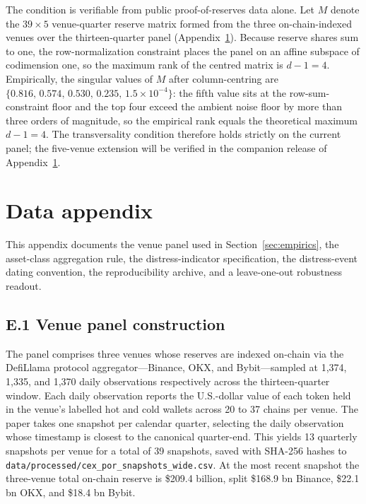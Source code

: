The condition is verifiable from public proof-of-reserves data
alone. Let $M$ denote the $39 \times 5$ venue-quarter reserve
matrix formed from the three on-chain-indexed venues over the
thirteen-quarter panel (Appendix~\ref{app:data}). Because reserve
shares sum to one, the row-normalization constraint places the
panel on an affine subspace of codimension one, so the maximum
rank of the centred matrix is $d - 1 = 4$. Empirically, the
singular values of $M$ after column-centring are
$\{0.816,\,0.574,\,0.530,\,0.235,\,1.5\times 10^{-4}\}$: the fifth
value sits at the row-sum-constraint floor and the top four
exceed the ambient noise floor by more than three orders of
magnitude, so the empirical rank equals the theoretical maximum
$d - 1 = 4$. The transversality condition therefore holds
strictly on the current panel; the five-venue extension will be
verified in the companion release of Appendix~\ref{app:data}.

\section{Data appendix}\label{app:data}

This appendix documents the venue panel used in
Section~\ref{sec:empirics}, the asset-class aggregation rule, the
distress-indicator specification, the distress-event dating
convention, the reproducibility archive, and a leave-one-out
robustness readout.

\subsection*{E.1 Venue panel construction}

The panel comprises three venues whose reserves are indexed
on-chain via the DefiLlama protocol aggregator---Binance, OKX, and
Bybit---sampled at 1,374, 1,335, and 1,370 daily observations
respectively across the thirteen-quarter window. Each daily
observation reports the U.S.-dollar value of each token held in
the venue's labelled hot and cold wallets across 20 to 37 chains
per venue. The paper takes one snapshot per calendar quarter,
selecting the daily observation whose timestamp is closest to the
canonical quarter-end. This yields 13 quarterly snapshots per
venue for a total of 39 snapshots, saved with SHA-256 hashes to
\texttt{data/processed/cex\_por\_snapshots\_wide.csv}. At the
most recent snapshot the three-venue total on-chain reserve is
\$209.4 billion, split \$168.9 bn Binance, \$22.1 bn OKX, and
\$18.4 bn Bybit.

